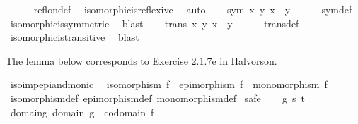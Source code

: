 \begin{isabellebody}
\ \ \ \ \isamarkupfalse%
\ refl{\isacharunderscore}{\kern0pt}on{\isacharunderscore}{\kern0pt}def\ \isamarkupfalse%
\ isomorphic{\isacharunderscore}{\kern0pt}is{\isacharunderscore}{\kern0pt}reflexive\ \isamarkupfalse%
\ auto\isanewline
{}\isamarkupfalse%
\isanewline
\ \ \isamarkupfalse%
\ {\isachardoublequoteopen}sym\ {\isacharbraceleft}{\kern0pt}{\isacharparenleft}{\kern0pt}x{\isacharcomma}{\kern0pt}\ y{\isacharparenright}{\kern0pt}{\isachardot}{\kern0pt}\ x\ {\isasymcong}\ y{\isacharbraceright}{\kern0pt}{\isachardoublequoteclose}\isanewline
\ \ \ \ \isamarkupfalse%
\ sym{\isacharunderscore}{\kern0pt}def\ \isamarkupfalse%
\ isomorphic{\isacharunderscore}{\kern0pt}is{\isacharunderscore}{\kern0pt}symmetric\ \isamarkupfalse%
\ blast\isanewline
{}\isamarkupfalse%
\isanewline
\ \ \isamarkupfalse%
\ {\isachardoublequoteopen}trans\ {\isacharbraceleft}{\kern0pt}{\isacharparenleft}{\kern0pt}x{\isacharcomma}{\kern0pt}\ y{\isacharparenright}{\kern0pt}{\isachardot}{\kern0pt}\ x\ {\isasymcong}\ y{\isacharbraceright}{\kern0pt}{\isachardoublequoteclose}\isanewline
\ \ \ \ \isamarkupfalse%
\ trans{\isacharunderscore}{\kern0pt}def\ \isamarkupfalse%
\ isomorphic{\isacharunderscore}{\kern0pt}is{\isacharunderscore}{\kern0pt}transitive\ \isamarkupfalse%
\ blast\isanewline
{}\isamarkupfalse%
%
\endisatagproof
{\isafoldproof}%
%
\isadelimproof
%
\endisadelimproof
%
\begin{isamarkuptext}%
The lemma below corresponds to Exercise 2.1.7e in Halvorson.%
\end{isamarkuptext}\isamarkuptrue%
\isamarkupfalse%
\ iso{\isacharunderscore}{\kern0pt}imp{\isacharunderscore}{\kern0pt}epi{\isacharunderscore}{\kern0pt}and{\isacharunderscore}{\kern0pt}monic{\isacharcolon}{\kern0pt}\isanewline
\ \ {\isachardoublequoteopen}isomorphism\ f\ {\isasymLongrightarrow}\ epimorphism\ f\ {\isasymand}\ monomorphism\ f{\isachardoublequoteclose}\isanewline
%
\isadelimproof
\ \ %
\endisadelimproof
%
\isatagproof
{}\isamarkupfalse%
\ isomorphism{\isacharunderscore}{\kern0pt}def\ epimorphism{\isacharunderscore}{\kern0pt}def\ monomorphism{\isacharunderscore}{\kern0pt}def\isanewline
{}\isamarkupfalse%
\ safe\isanewline
\ \ \isamarkupfalse%
\ g\ s\ t\isanewline
\ \ \isamarkupfalse%
\ domain{\isacharunderscore}{\kern0pt}g{\isacharcolon}{\kern0pt}\ {\isachardoublequoteopen}domain\ g\ {\isacharequal}{\kern0pt}\ codomain\ f{\isachardoublequoteclose}\isanewline

\end{isabellebody}

